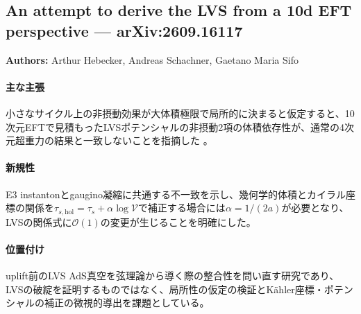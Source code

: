 \subsection{An attempt to derive the LVS from a 10d EFT perspective --- arXiv:2609.16117}

\textbf{Authors:} Arthur Hebecker, Andreas Schachner, Gaetano Maria Sifo

\paragraph{主な主張}
小さなサイクル上の非摂動効果が大体積極限で局所的に決まると仮定すると、10次元EFTで見積もったLVSポテンシャルの非摂動2項の体積依存性が、通常の4次元超重力の結果と一致しないことを指摘した \cite{Hebecker:2026LVSEFT}。

\paragraph{新規性}
E3 instantonとgaugino凝縮に共通する不一致を示し、幾何学的体積とカイラル座標の関係を$\tau_{s,\mathrm{hol}}=\tau_s+\alpha\log\mathcal V$で補正する場合には$\alpha=1/(2a)$が必要となり、LVSの関係式に$\mathcal O(1)$の変更が生じることを明確にした。

\paragraph{位置付け}
uplift前のLVS AdS真空を弦理論から導く際の整合性を問い直す研究であり、LVSの破綻を証明するものではなく、局所性の仮定の検証とK\"ahler座標・ポテンシャルの補正の微視的導出を課題としている。
